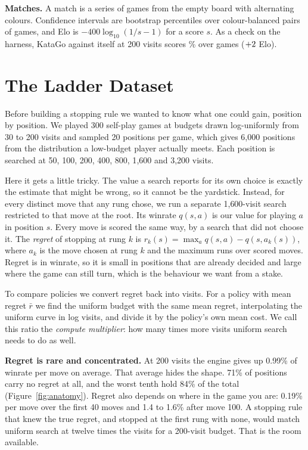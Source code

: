 \documentclass{article}
\begin{document}
\textbf{Matches.} A match is a series of games from the empty board with alternating colours. Confidence intervals are bootstrap percentiles over colour-balanced pairs of games, and Elo is $-400\log_{10}(1/s-1)$ for a score $s$. As a check on the harness, KataGo against itself at 200 visits scores \unisameScore\% over \unisameGames{} games ($+2$ Elo).

\section{The Ladder Dataset}
\label{sec:ladder}

Before building a stopping rule we wanted to know what one could gain, position by position. We played 300 self-play games at budgets drawn log-uniformly from 30 to 200 visits and sampled 20 positions per game, which gives 6{,}000 positions from the distribution a low-budget player actually meets. Each position is searched at 50, 100, 200, 400, 800, 1{,}600 and 3{,}200 visits.

Here it gets a little tricky. The value a search reports for its own choice is exactly the estimate that might be wrong, so it cannot be the yardstick. Instead, for every distinct move that any rung chose, we run a separate 1{,}600-visit search restricted to that move at the root. Its winrate $q(s,a)$ is our value for playing $a$ in position $s$. Every move is scored the same way, by a search that did not choose it. The \emph{regret} of stopping at rung $k$ is $r_k(s)=\max_{a} q(s,a)-q(s,a_k(s))$, where $a_k$ is the move chosen at rung $k$ and the maximum runs over scored moves. Regret is in winrate, so it is small in positions that are already decided and large where the game can still turn, which is the behaviour we want from a stake.

To compare policies we convert regret back into visits. For a policy with mean regret $\bar r$ we find the uniform budget with the same mean regret, interpolating the uniform curve in log visits, and divide it by the policy's own mean cost. We call this ratio the \emph{compute multiplier}: how many times more visits uniform search needs to do as well.

\textbf{Regret is rare and concentrated.} At 200 visits the engine gives up 0.99\% of winrate per move on average. That average hides the shape. 71\% of positions carry no regret at all, and the worst tenth hold 84\% of the total (Figure~\ref{fig:anatomy}). Regret also depends on where in the game you are: 0.19\% per move over the first 40 moves and 1.4 to 1.6\% after move 100. A stopping rule that knew the true regret, and stopped at the first rung with none, would match uniform search at twelve times the visits for a 200-visit budget. That is the room available.
\end{document}
